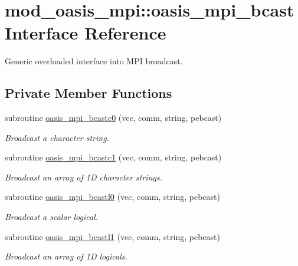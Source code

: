 \hypertarget{interfacemod__oasis__mpi_1_1oasis__mpi__bcast}{}\section{mod\+\_\+oasis\+\_\+mpi\+:\+:oasis\+\_\+mpi\+\_\+bcast Interface Reference}
\label{interfacemod__oasis__mpi_1_1oasis__mpi__bcast}


Generic overloaded interface into M\+PI broadcast.  


\subsection*{Private Member Functions}
\begin{DoxyCompactItemize}
\item 
subroutine \hyperlink{interfacemod__oasis__mpi_1_1oasis__mpi__bcast_ae9e3dad3027638f11550c87f1a91f780}{oasis\+\_\+mpi\+\_\+bcastc0} (vec, comm, string, pebcast)
\begin{DoxyCompactList}\small\item\em Broadcast a character string. \end{DoxyCompactList}\item 
subroutine \hyperlink{interfacemod__oasis__mpi_1_1oasis__mpi__bcast_a074f77b4c72165e03e7955965e5a50bc}{oasis\+\_\+mpi\+\_\+bcastc1} (vec, comm, string, pebcast)
\begin{DoxyCompactList}\small\item\em Broadcast an array of 1D character strings. \end{DoxyCompactList}\item 
subroutine \hyperlink{interfacemod__oasis__mpi_1_1oasis__mpi__bcast_ae97f34e1ec8a66cce79cd18664ad108e}{oasis\+\_\+mpi\+\_\+bcastl0} (vec, comm, string, pebcast)
\begin{DoxyCompactList}\small\item\em Broadcast a scalar logical. \end{DoxyCompactList}\item 
subroutine \hyperlink{interfacemod__oasis__mpi_1_1oasis__mpi__bcast_aa2900064ce9079a6a2b4a8e55ff28ce7}{oasis\+\_\+mpi\+\_\+bcastl1} (vec, comm, string, pebcast)
\begin{DoxyCompactList}\small\item\em Broadcast an array of 1D logicals. \end{DoxyCompactList}\item 

\end{DoxyCompactItemize}
